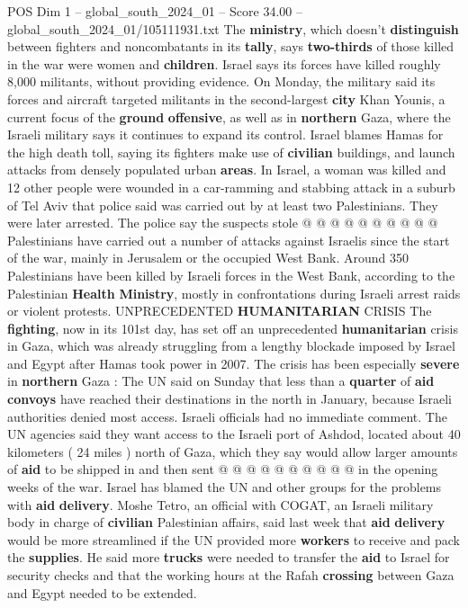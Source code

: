 \begin{textsample}{POS Dim 1 – global\_south\_2024\_01 – Score 34.00 – global\_south\_2024\_01/105111931.txt}
The \textbf{ministry}, which doesn't \textbf{distinguish} between fighters and noncombatants in its \textbf{tally}, says \textbf{two-thirds} of those killed in the war were women and \textbf{children}.
Israel says its forces have killed roughly 8,000 militants, without providing evidence.
On Monday, the military said its forces and aircraft targeted militants in the second-largest \textbf{city} Khan Younis, a current focus of the \textbf{ground} \textbf{offensive}, as well as in \textbf{northern} Gaza, where the Israeli military says it continues to expand its control.
Israel blames Hamas for the high death toll, saying its fighters make use of \textbf{civilian} buildings, and launch attacks from densely populated urban \textbf{areas}.
In Israel, a woman was killed and 12 other people were wounded in a car-ramming and stabbing attack in a suburb of Tel Aviv that police said was carried out by at least two Palestinians.
They were later arrested.
The police say the suspects stole @ @ @ @ @ @ @ @ @ @ Palestinians have carried out a number of attacks against Israelis since the start of the war, mainly in Jerusalem or the occupied West Bank.
Around 350 Palestinians have been killed by Israeli forces in the West Bank, according to the Palestinian \textbf{Health} \textbf{Ministry}, mostly in confrontations during Israeli arrest raids or violent protests.
UNPRECEDENTED \textbf{HUMANITARIAN} CRISIS The \textbf{fighting}, now in its 101st day, has set off an unprecedented \textbf{humanitarian} crisis in Gaza, which was already struggling from a lengthy blockade imposed by Israel and Egypt after Hamas took power in 2007.
The crisis has been especially \textbf{severe} in \textbf{northern} Gaza : The UN said on Sunday that less than a \textbf{quarter} of \textbf{aid} \textbf{convoys} have reached their destinations in the north in January, because Israeli authorities denied most access.
Israeli officials had no immediate comment.
The UN agencies said they want access to the Israeli port of Ashdod, located about 40 kilometers ( 24 miles ) north of Gaza, which they say would allow larger amounts of \textbf{aid} to be shipped in and then sent @ @ @ @ @ @ @ @ @ @ in the opening weeks of the war.
Israel has blamed the UN and other groups for the problems with \textbf{aid} \textbf{delivery}.
Moshe Tetro, an official with COGAT, an Israeli military body in charge of \textbf{civilian} Palestinian affairs, said last week that \textbf{aid} \textbf{delivery} would be more streamlined if the UN provided more \textbf{workers} to receive and pack the \textbf{supplies}.
He said more \textbf{trucks} were needed to transfer the \textbf{aid} to Israel for security checks and that the working hours at the Rafah \textbf{crossing} between Gaza and Egypt needed to be extended.

\end{textsample}
